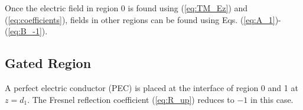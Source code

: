 \documentclass[11pt]{article}
\begin{document}
  Once the electric field in region 0 is found  using (\ref{eq:TM_Ez}) and (\ref{eq:coefficients}), fields in other regions can be found using Eqs. (\ref{eq:A_1})-(\ref{eq:B_-1}).

  \subsection{Gated Region}

  A perfect electric conductor (PEC) is placed at the interface of region 0 and 1 at $z=d_1$. The Fresnel reflection coefficient (\ref{eq:R_up}) reduces to $-1$ in this case.



  
  
\end{document}
